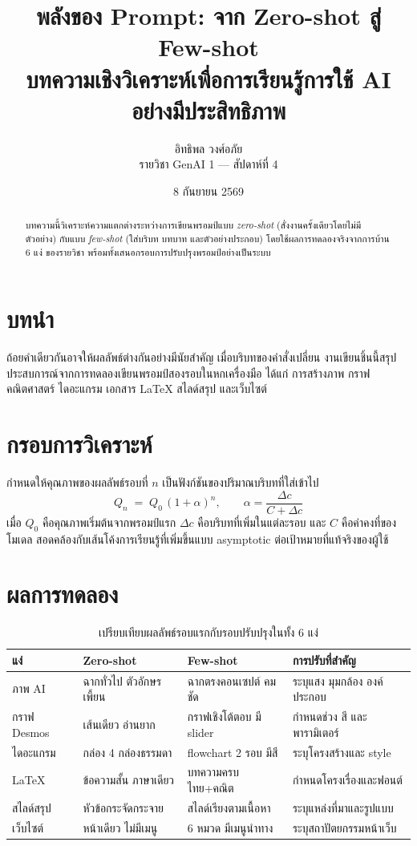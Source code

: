 \documentclass[11pt,a4paper]{article}
\title{\textbf{พลังของ Prompt: จาก Zero-shot สู่ Few-shot}\\[4pt]
\large บทความเชิงวิเคราะห์เพื่อการเรียนรู้การใช้ AI อย่างมีประสิทธิภาพ}
\author{อิทธิพล วงศ์อภัย \\ \small รายวิชา GenAI 1 — สัปดาห์ที่ 4}
\date{8 กันยายน 2569}
\begin{document}
\maketitle

\begin{abstract}
บทความนี้วิเคราะห์ความแตกต่างระหว่างการเขียนพรอมป์แบบ \emph{zero-shot} (สั่งงานครั้งเดียวโดยไม่มีตัวอย่าง)
กับแบบ \emph{few-shot} (ใส่บริบท บทบาท และตัวอย่างประกอบ) โดยใช้ผลการทดลองจริงจากการบ้าน 6 แง่
ของรายวิชา พร้อมทั้งเสนอกรอบการปรับปรุงพรอมป์อย่างเป็นระบบ
\end{abstract}

\section{บทนำ}
ถ้อยคำเดียวกันอาจให้ผลลัพธ์ต่างกันอย่างมีนัยสำคัญ เมื่อบริบทของคำสั่งเปลี่ยน
งานเขียนชิ้นนี้สรุปประสบการณ์จากการทดลองเขียนพรอมป์สองรอบในหกเครื่องมือ
ได้แก่ การสร้างภาพ กราฟคณิตศาสตร์ ไดอะแกรม เอกสาร LaTeX สไลด์สรุป และเว็บไซต์

\section{กรอบการวิเคราะห์}
กำหนดให้คุณภาพของผลลัพธ์รอบที่ $n$ เป็นฟังก์ชันของปริมาณบริบทที่ใส่เข้าไป
\begin{equation}
Q_n \;=\; Q_0 \,(1+\alpha)^{n}, \qquad \alpha = \frac{\Delta c}{C + \Delta c}
\end{equation}
เมื่อ $Q_0$ คือคุณภาพเริ่มต้นจากพรอมป์แรก $\Delta c$ คือบริบทที่เพิ่มในแต่ละรอบ
และ $C$ คือค่าคงที่ของโมเดล สอดคล้องกับเส้นโค้งการเรียนรู้ที่เพิ่มขึ้นแบบ asymptotic
ต่อเป้าหมายที่แท้จริงของผู้ใช้

\section{ผลการทดลอง}
\begin{table}[h]
\centering
\begin{tabular}{@{}llll@{}}
\toprule
\textbf{แง่} & \textbf{Zero-shot} & \textbf{Few-shot} & \textbf{การปรับที่สำคัญ} \\
\midrule
ภาพ AI & ฉากทั่วไป ตัวอักษรเพี้ยน & ฉากตรงคอนเซปต์ คมชัด & ระบุแสง มุมกล้อง องค์ประกอบ \\
กราฟ Desmos & เส้นเดียว อ่านยาก & กราฟเชิงโต้ตอบ มี slider & กำหนดช่วง สี และพารามิเตอร์ \\
ไดอะแกรม & กล่อง 4 กล่องธรรมดา & flowchart 2 รอบ มีสี & ระบุโครงสร้างและ style \\
LaTeX & ข้อความสั้น ภาษาเดียว & บทความครบ ไทย+คณิต & กำหนดโครงเรื่องและฟอนต์ \\
สไลด์สรุป & หัวข้อกระจัดกระจาย & สไลด์เรียงตามเนื้อหา & ระบุแหล่งที่มาและรูปแบบ \\
เว็บไซต์ & หน้าเดียว ไม่มีเมนู & 6 หมวด มีเมนูนำทาง & ระบุสถาปัตยกรรมหน้าเว็บ \\
\bottomrule
\end{tabular}
\caption{เปรียบเทียบผลลัพธ์รอบแรกกับรอบปรับปรุงในทั้ง 6 แง่}
\end{table}
\end{document}
